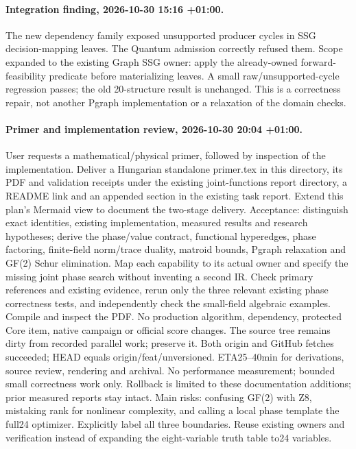 \documentclass{article}
\begin{document}
\paragraph{Integration finding, 2026-10-30 15:16 +01:00.} The new dependency
family exposed unsupported producer cycles in SSG decision-mapping leaves.
The Quantum admission correctly refused them. Scope expanded to the existing
Graph SSG owner: apply the already-owned forward-feasibility predicate before
materializing leaves. A small raw/unsupported-cycle regression passes; the old
20-structure result is unchanged. This is a correctness repair, not another
Pgraph implementation or a relaxation of the domain checks.
\paragraph{Primer and implementation review, 2026-10-30 20:04 +01:00.}
User requests a mathematical/physical primer, followed by inspection of the
implementation. Deliver a Hungarian standalone primer.tex in this directory,
its PDF and validation receipts under the existing joint-functions report
directory, a README link and an appended section in the existing task report.
Extend this plan's Mermaid view to document the two-stage delivery.
Acceptance: distinguish exact identities, existing implementation, measured
results and research hypotheses; derive the phase/value contract, functional
hyperedges, phase factoring, finite-field norm/trace duality, matroid bounds,
Pgraph relaxation and GF(2) Schur elimination. Map each capability to its actual
owner and specify the missing joint phase search without inventing a second IR.
Check primary references and existing evidence, rerun only the three relevant
existing phase correctness tests, and independently check the small-field
algebraic examples. Compile and inspect the PDF. No production algorithm,
dependency, protected Core item, native campaign or official score changes.
The source tree remains dirty from recorded parallel work; preserve it.
Both origin and GitHub fetches succeeded; HEAD equals origin/feat/unversioned.
ETA25--40min for derivations, source review, rendering and archival. No
performance measurement; bounded small correctness work only. Rollback is
limited to these documentation additions; prior measured reports stay intact.
Main risks: confusing GF(2) with Z8, mistaking rank for nonlinear complexity,
and calling a local phase template the full24 optimizer. Explicitly label all
three boundaries. Reuse existing owners and verification instead of expanding
the eight-variable truth table to24 variables.
\end{document}
